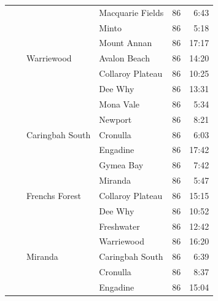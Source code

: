\documentclass{grattan}
\begin{document}
\begin{longtable}{Nlllrr}
 &                                &                       & Macquarie Fields     & 86  & 6:43 \\
 &                                &                       & Minto                & 86  & 5:18 \\
 &                                &                       & Mount Annan          & 86  & 17:17 \\
 &                                & Warriewood            & Avalon Beach         & 86  & 14:20 \\
 &                                &                       & Collaroy Plateau     & 86  & 10:25 \\
 &                                &                       & Dee Why              & 86  & 13:31 \\
 &                                &                       & Mona Vale            & 86  & 5:34 \\
 &                                &                       & Newport              & 86  & 8:21 \\
 &                                & Caringbah South       & Cronulla             & 86  & 6:03 \\
 &                                &                       & Engadine             & 86  & 17:42 \\
 &                                &                       & Gymea Bay            & 86  & 7:42 \\
 &                                &                       & Miranda              & 86  & 5:47 \\
 &                                & Frenchs Forest        & Collaroy Plateau     & 86  & 15:15 \\
 &                                &                       & Dee Why              & 86  & 10:52 \\
 &                                &                       & Freshwater           & 86  & 12:42 \\
 &                                &                       & Warriewood           & 86  & 16:20 \\
 &                                & Miranda               & Caringbah South      & 86  & 6:39 \\
 &                                &                       & Cronulla             & 86  & 8:37 \\
 &                                &                       & Engadine             & 86  & 15:04 \\

\end{longtable}
\end{document}
